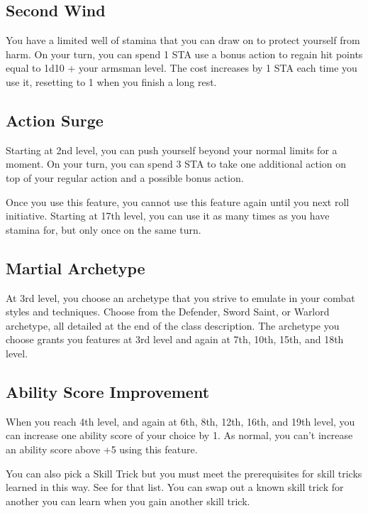 \subsection{Second Wind}

You have a limited well of stamina that you can draw on to protect yourself from harm. On your turn, you can spend 1 STA use a bonus action to regain hit points equal to 1d10 + your armsman level. The cost increases by 1 STA each time you use it, resetting to 1 when you finish a long rest.

\subsection{Action Surge}

Starting at 2nd level, you can push yourself beyond your normal limits for a moment. On your turn, you can spend 3 STA to take one additional action on top of your regular action and a possible bonus action.

Once you use this feature, you cannot use this feature again until you next roll initiative. Starting at 17th level, you can use it as many times as you have stamina for, but only once on the same turn.

\subsection{Martial Archetype}

At 3rd level, you choose an archetype that you strive to emulate in your combat styles and techniques. Choose from the Defender, Sword Saint, or Warlord archetype, all detailed at the end of the class description. The archetype you choose grants you features at 3rd level and again at 7th, 10th, 15th, and 18th level.

\subsection{Ability Score Improvement}

When you reach 4th level, and again at 6th, 8th, 12th, 16th, and 19th level, you can increase one ability score of your choice by 1. As normal, you can't increase an ability score above +5 using this feature.

You can also pick a Skill Trick but you must meet the prerequisites for skill tricks learned in this way. See  for that list. You can swap out a known skill trick for another you can learn when you gain another skill trick.

